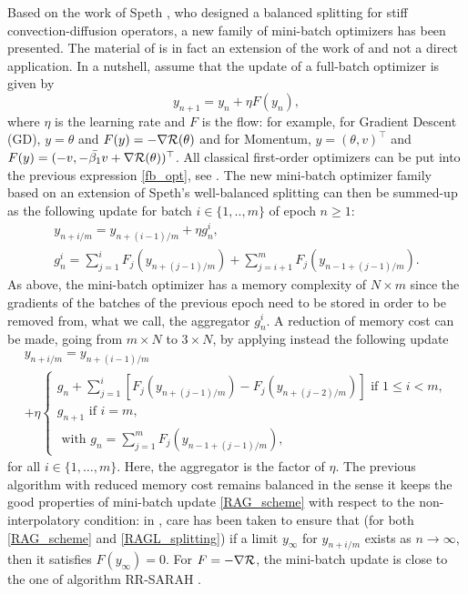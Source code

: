 Based on the work of Speth \cite{rebalanced_splitting}, who designed a balanced splitting for stiff convection-diffusion operators, a new family of mini-batch optimizers has been
presented.  
The material of \cite{partI} is in fact an extension of the work of \cite{rebalanced_splitting} and not a direct application.
In a nutshell, assume that the update of a full-batch optimizer is given by
\begin{equation}
  \label{fb_opt}
        y_{n+1} = y_{n}+\eta F(y_n),
\end{equation}
where $\eta$ is the learning rate and $F$ is the flow: for example, 
for Gradient Descent (GD), $y=\theta$ and $F(y)=-\nabla \mathcal{R}(\theta)$ and 
for Momentum, $y=(\theta,v)^\top$ and $F(y)=(-v, -\bar{\beta_1} v +
\nabla \mathcal{R}(\theta))^\top$. 
All classical first-order optimizers can be put into the previous expression \eqref{fb_opt}, see \cite{Barakat_bianchi}.  
The new mini-batch optimizer family based on an extension of Speth's well-balanced splitting
can then be summed-up as the following update for batch $i\in\{1,..,m\}$ of epoch $n\geq 1$:
\begin{equation}
  \begin{array}{c}
	y_{n+i/m} = y_{n+(i-1)/m}+\eta g_n^i,\\
	g_n^i = \sum_{j=1}^i F_j\left(y_{n+(j-1)/m}\right)+\sum_{j=i+1}^m F_j\left(y_{n-1+(j-1)/m}\right).
  \end{array}
	\label{RAG_scheme}
\end{equation}
As above, the mini-batch optimizer has a memory complexity of $N\times m$ since the gradients of the batches of the previous epoch need to be stored in order to be removed from,
what we call, the aggregator $g_n^i$. A reduction of memory cost can be made, going from $m\times N$ to $3 \times N$, by applying instead the following update
\begin{multline}
	y_{n+i/m} = y_{n+(i-1)/m} \\
	+\eta
	\left\{
	\begin{array}{ll}
		g_n+\displaystyle{\sum_{j=1}^i} \left[F_j\left(y_{n+(j-1)/m}\right)-F_j\left(y_{n+(j-2)/m}\right)\right] \text{ if } 1\leq i<m,\\
		g_{n+1} \text{ if } i=m,\\
                \text{ with } 
	g_n = \sum_{j=1}^m F_j\left(y_{n-1+(j-1)/m}\right),
	\end{array}
	\right.
	\label{RAGL_splitting}
\end{multline}
for all $i \in \{1,\dots,m\}$. Here, the aggregator is the factor of $\eta$. The previous algorithm with reduced memory cost remains balanced in the sense it keeps the good properties of mini-batch update \eqref{RAG_scheme}
with respect to the non-interpolatory condition: in \cite{partI}, care has been taken to ensure that (for both \eqref{RAG_scheme} and \eqref{RAGL_splitting}) if a limit $y_\infty$ for $y_{n+i/m}$ exists as $n\rightarrow \infty$, then it satisfies $F(y_\infty)=0$. 
For $F=-\nabla \mathcal{R}$, the mini-batch update is close to the one of algorithm RR-SARAH \cite{RR_SARAH}.

